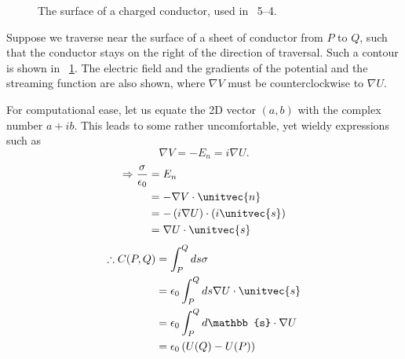 \item

\begin{figure}[ht]
    \centering
    \caption{The surface of a charged conductor, used in ~5--4.}%
    \label{fig:problem5-4}
\end{figure}

Suppose we traverse near the surface of a sheet of conductor from $P$ to $Q$,
such that the conductor stays on the right of the direction of traversal.
Such a contour is shown in ~\ref{fig:problem5-4}.
The electric field and the gradients of the potential and the streaming function are also shown,
where $\nabla V$ must be counterclockwise to $\nabla U$.

For computational ease, let us equate the 2D vector $(a, b)$ with the complex number $a + ib$.
This leads to some rather uncomfortable, yet wieldy expressions such as
\[
    \nabla V = -E_n = i \nabla U.
\]
\begin{align*}
    \Rightarrow \frac{\sigma}{\epsilon_0}
    &= E_n \\
    &= -\nabla V \cdot \unitvec{n} \\
    &= - \left( i\nabla U \right) \cdot \left( i \unitvec{s} \right) \\
    &= \nabla U \cdot \unitvec{s}
\end{align*}
\begin{align*}
    \therefore C(P, Q)
    &= \int_P^Q ds \sigma \\
    &= \epsilon_0 \int_P^Q ds \nabla U \cdot \unitvec{s} \\
    &= \epsilon_0 \int_P^Q d\mathbb{s} \cdot \nabla U \\
    &= \epsilon_0 \left( U(Q) - U(P) \right)
\end{align*}